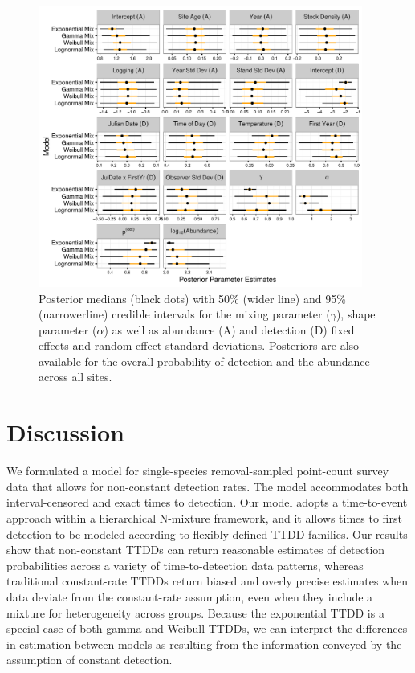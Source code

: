 \documentclass[12pt]{article}
\begin{document}
\begin{figure}[h!]\centering
\includegraphics[width=0.95\textwidth]{OVEN/oven_sum/OVEN_Posteriors} %
\caption{\label{ovenposteriors} Posterior medians (black dots) with 50\% (wider line) and 95\% (narrowerline) credible intervals for the mixing parameter ($\gamma$), shape parameter ($\alpha$) as well as abundance (A) and detection (D) fixed effects and random effect standard deviations.
Posteriors are also available for the overall probability of detection and the abundance across all sites.}
\end{figure}





\section{Discussion} \label{sec:discuss}

We formulated a model for single-species removal-sampled point-count survey data that allows for non-constant detection rates.
The model accommodates both interval-censored and exact times to detection.
Our model adopts a time-to-event approach within a hierarchical N-mixture framework, and it allows times to first detection to be modeled according to flexibly defined TTDD families.
Our results show that non-constant TTDDs can return reasonable estimates of detection probabilities across a variety of time-to-detection data patterns, whereas traditional constant-rate TTDDs return biased and overly precise estimates when data deviate from the constant-rate assumption, even when they include a mixture for heterogeneity across groups.  
Because the exponential TTDD is a special case of both gamma and Weibull TTDDs, we can interpret the differences in estimation between models as resulting from the information conveyed by the assumption of constant detection.
\end{document}
